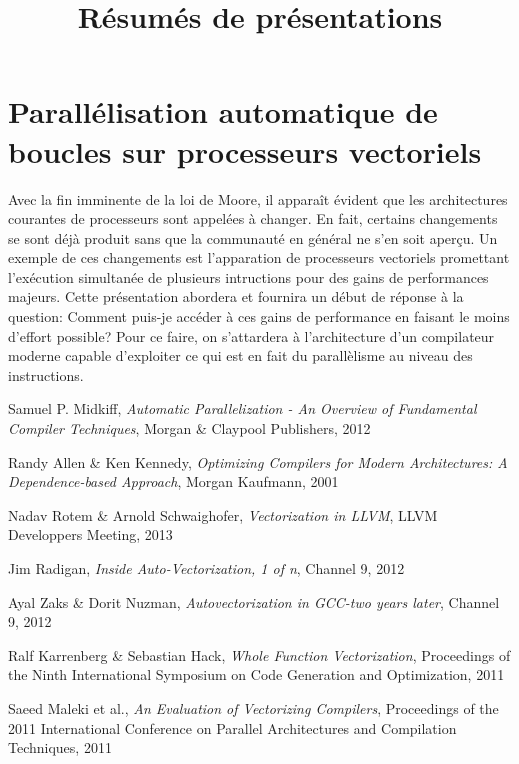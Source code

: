 \documentclass{article}
\title{Résumés de présentations}
\date{}
\begin{document}
\maketitle

\section*{Parallélisation automatique de boucles sur processeurs vectoriels}
Avec la fin imminente de la loi de Moore, il apparaît évident que les architectures courantes de processeurs sont appelées à changer. En fait, certains changements se sont déjà produit sans que la communauté en général ne s'en soit aperçu. Un exemple de ces changements est l'apparation de processeurs vectoriels promettant l'exécution simultanée de plusieurs intructions pour des gains de performances majeurs. Cette présentation abordera et fournira un début de réponse à la question: Comment puis-je accéder à ces gains de performance en faisant le moins d'effort possible? Pour ce faire, on s'attardera à l'architecture d'un compilateur moderne capable d'exploiter ce qui est en fait du parallèlisme au niveau des instructions.

\renewcommand\refname{Références Autovectorization}
\begin{thebibliography}{9}
          Samuel P. Midkiff,
          \emph{Automatic Parallelization - An Overview of Fundamental Compiler Techniques},
          Morgan \& Claypool Publishers, 2012
          
          Randy Allen \& Ken Kennedy,
          \emph{Optimizing Compilers for Modern Architectures: A Dependence-based Approach},
          Morgan Kaufmann, 2001
          
          Nadav Rotem \& Arnold Schwaighofer,
          \emph{Vectorization in LLVM},
          LLVM Developpers Meeting, 2013
          
          Jim Radigan,
          \emph{Inside Auto-Vectorization, 1 of n},
          Channel 9, 2012
          
          Ayal Zaks \& Dorit Nuzman,
          \emph{Autovectorization in GCC-two years later},
          Channel 9, 2012
          
          Ralf Karrenberg \& Sebastian Hack,
          \emph{Whole Function Vectorization},
          Proceedings of the Ninth International Symposium on Code Generation and Optimization, 2011
          
          Saeed Maleki et al.,
          \emph{An Evaluation of Vectorizing Compilers},
          Proceedings of the 2011 International Conference on Parallel Architectures and Compilation Techniques, 2011
\end{thebibliography}
\end{document}

